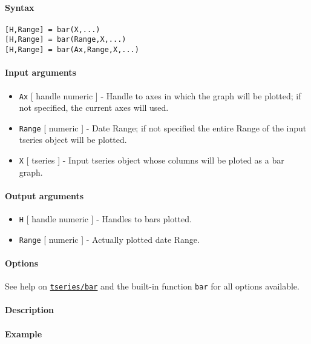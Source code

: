 


	\paragraph{Syntax}\label{syntax}

\begin{verbatim}
[H,Range] = bar(X,...)
[H,Range] = bar(Range,X,...)
[H,Range] = bar(Ax,Range,X,...)
\end{verbatim}

\paragraph{Input arguments}\label{input-arguments}

\begin{itemize}
\item
  \texttt{Ax} {[} handle \textbar{} numeric {]} - Handle to axes in
  which the graph will be plotted; if not specified, the current axes
  will used.
\item
  \texttt{Range} {[} numeric {]} - Date Range; if not specified the
  entire Range of the input tseries object will be plotted.
\item
  \texttt{X} {[} tseries {]} - Input tseries object whose columns will
  be ploted as a bar graph.
\end{itemize}

\paragraph{Output arguments}\label{output-arguments}

\begin{itemize}
\item
  \texttt{H} {[} handle \textbar{} numeric {]} - Handles to bars
  plotted.
\item
  \texttt{Range} {[} numeric {]} - Actually plotted date Range.
\end{itemize}

\paragraph{Options}\label{options}

See help on \href{tseries/bar}{\texttt{tseries/bar}} and the built-in
function \texttt{bar} for all options available.

\paragraph{Description}\label{description}

\paragraph{Example}\label{example}


